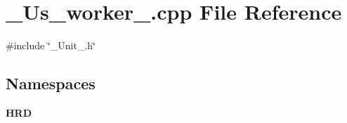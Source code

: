 \section{\+\_\+\+Us\+\_\+worker\+\_\+.\+cpp File Reference}
\label{___us__worker___8cpp}
{\ttfamily \#include \char`\"{}\+\_\+\+Unit\+\_\+.\+h\char`\"{}}\newline
\subsection*{Namespaces}
\begin{DoxyCompactItemize}
\item 
 \textbf{ H\+RD}
\end{DoxyCompactItemize}
